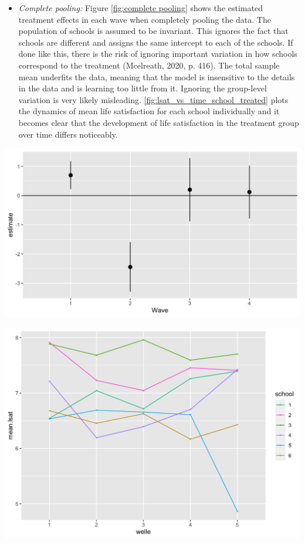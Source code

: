 \documentclass[a4, 12pt]{article}
\providecommand{\tightlist}{%
  \setlength{\itemsep}{0pt}\setlength{\parskip}{0pt}}
\begin{document}
\begin{itemize}
\tightlist
\item
  \emph{Complete pooling:}
  Figure \ref{fig:complete pooling} shows the estimated treatment effects in each wave when completely pooling the data. The population of schools is assumed to be invariant. This ignores the fact that schools are different and assigns the same intercept to each of the schools. If done like this, there is the risk of ignoring important variation in how schools correspond to the treatment (Mcelreath, 2020, p. 416). The total sample mean underfits the data, meaning that the model is insensitive to the details in the data and is learning too little from it. Ignoring the group-level variation is very likely misleading. \ref{fig:lsat_vs_time_school_treated} plots the dynamics of mean life satisfaction for each school individually and it becomes clear that the development of life satisfaction in the treatment group over time differs noticeably.
\end{itemize}

\includegraphics[width=1\linewidth]{../figures/complete_pool}

\includegraphics[width=1\linewidth]{../figures/lsat_vs_time_by_school_treated}
\end{document}
